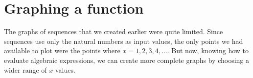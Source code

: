 
%
%
%


\section{Graphing a function}
\label{sec:graphingfunc}

The graphs of sequences that we created earlier were quite limited. Since sequences use only the natural numbers as input values, the only points we had available to plot were the points where $x = 1, 2, 3, 4, \dotsc$. But now, knowing how to evaluate algebraic expressions, we can create more complete graphs by choosing a wider range of $x$ values.

